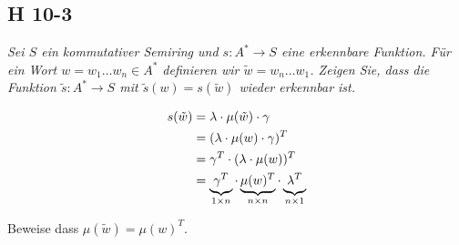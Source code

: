 \documentclass{scrartcl}
\begin{document}
\subsection{H 10-3}

\textsl{Sei $S$ ein kommutativer Semiring und $s: A^* \rightarrow S$ eine erkennbare Funktion. Für ein Wort $w = w_1 \ldots w_n \in A^*$ definieren wir $\tilde{w} = w_n \ldots w_1$. Zeigen Sie, dass die Funktion $\tilde{s} : A^* \rightarrow S$ mit $\tilde{s}(w) = s(\tilde{w})$ wieder erkennbar ist.}

\begin{align*}
    s(\tilde{w}) &= \lambda \cdot \mu(\tilde{w}) \cdot \gamma\\
                 &= (\lambda \cdot \mu(w) \cdot \gamma)^T\\
                 &= \gamma^T \cdot (\lambda \cdot \mu(w))^T\\
                 &= \underbrace{\gamma^T \vphantom{\mu(w)^T}}_{1 \times n} \cdot \underbrace{\mu(w)^T}_{n \times n} \cdot \underbrace{\lambda^T \vphantom{\mu(w)^T}}_{n \times 1}\\
\end{align*}

Beweise dass $\mu(\tilde{w}) = \mu(w)^T$.
\end{document}

